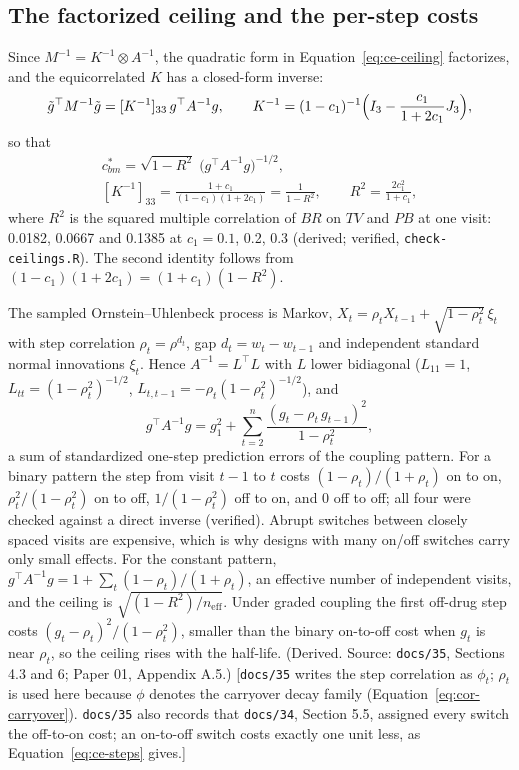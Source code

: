\documentclass[11pt]{article}
\newcommand{\note}[1]{\textcolor{blue!60!black}{\small [#1]}}
\newcommand{\code}[1]{\texttt{#1}}
\begin{document}
\subsection{The factorized ceiling and the per-step costs}
\label{sec:ce-factor}

Since $M^{-1} = K^{-1} \otimes A^{-1}$, the quadratic form in
Equation~\eqref{eq:ce-ceiling} factorizes, and the equicorrelated $K$
has a closed-form inverse:
\[
\tilde g^{\top} M^{-1} \tilde g = [K^{-1}]_{33}\, g^{\top} A^{-1} g,
\qquad
K^{-1} = (1 - c_1)^{-1}\Bigl(I_3 - \frac{c_1}{1 + 2c_1} J_3\Bigr),
\]
so that
\begin{equation}
\begin{gathered}
c_{bm}^{\ast} = \sqrt{1 - R^2}\;\bigl(g^{\top} A^{-1} g\bigr)^{-1/2},
\\
[K^{-1}]_{33} = \frac{1 + c_1}{(1 - c_1)(1 + 2c_1)} = \frac{1}{1 - R^2},
\qquad R^2 = \frac{2c_1^2}{1 + c_1},
\end{gathered}
\label{eq:ce-factor}
\end{equation}
where $R^2$ is the squared multiple correlation of $BR$ on $TV$ and
$PB$ at one visit: 0.0182, 0.0667 and 0.1385 at $c_1 = 0.1$, 0.2, 0.3
(derived; verified, \code{check-ceilings.R}). The second identity
follows from $(1 - c_1)(1 + 2c_1) = (1 + c_1)(1 - R^2)$.

The sampled Ornstein--Uhlenbeck process is Markov,
$X_t = \rho_t X_{t-1} + \sqrt{1 - \rho_t^2}\,\xi_t$ with step
correlation $\rho_t = \rho^{d_t}$, gap $d_t = w_t - w_{t-1}$ and
independent standard normal innovations $\xi_t$. Hence
$A^{-1} = L^{\top}L$ with $L$ lower bidiagonal ($L_{11} = 1$,
$L_{tt} = (1-\rho_t^2)^{-1/2}$, $L_{t,t-1} = -\rho_t(1-\rho_t^2)^{-1/2}$),
and
\begin{equation}
g^{\top} A^{-1} g = g_1^2 + \sum_{t=2}^{n}
  \frac{(g_t - \rho_t\, g_{t-1})^2}{1 - \rho_t^2},
\label{eq:ce-steps}
\end{equation}
a sum of standardized one-step prediction errors of the coupling
pattern. For a binary pattern the step from visit $t-1$ to $t$ costs
$(1 - \rho_t)/(1 + \rho_t)$ on to on, $\rho_t^2/(1 - \rho_t^2)$ on to
off, $1/(1 - \rho_t^2)$ off to on, and 0 off to off; all four were
checked against a direct inverse (verified). Abrupt switches between
closely spaced visits are expensive, which is why designs with many
on/off switches carry only small effects. For the constant pattern,
$g^{\top}A^{-1}g = 1 + \sum_t (1 - \rho_t)/(1 + \rho_t)$, an effective
number of independent visits, and the ceiling is
$\sqrt{(1 - R^2)/n_{\mathrm{eff}}}$. Under graded coupling the first
off-drug step costs $(g_t - \rho_t)^2/(1 - \rho_t^2)$, smaller than
the binary on-to-off cost when $g_t$ is near $\rho_t$, so the ceiling
rises with the half-life. (Derived. Source: \code{docs/35}, Sections
4.3 and 6; Paper 01, Appendix A.5.) \note{\code{docs/35} writes the
step correlation as $\phi_t$; $\rho_t$ is used here because $\phi$
denotes the carryover decay family (Equation~\eqref{eq:cor-carryover}).
\code{docs/35} also records that \code{docs/34}, Section 5.5, assigned
every switch the off-to-on cost; an on-to-off switch costs exactly one
unit less, as Equation~\eqref{eq:ce-steps} gives.}
\end{document}
